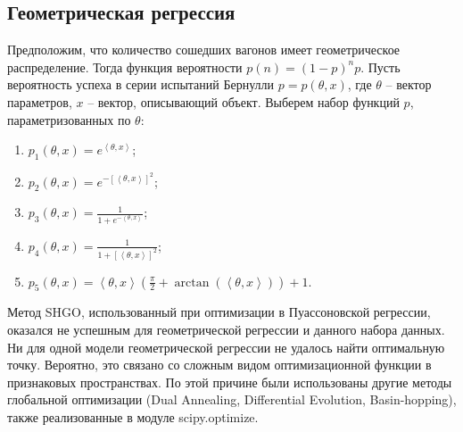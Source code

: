 


\subsection{Геометрическая регрессия}

Предположим, что количество сошедших вагонов имеет геометрическое распределение. Тогда функция вероятности $p(n) = (1-p)^n p$. Пусть вероятность успеха в серии испытаний Бернулли $p = p(\theta, x)$, где $\theta$ -- вектор параметров, $x$ -- вектор, описывающий объект. Выберем набор функций $p$, параметризованных по $\theta$:
\begin{enumerate}[label=\arabic*.]
    \item $p_1(\theta, x) = e^{\left\langle \theta, x\right\rangle}$;
    \item $p_2(\theta, x) = e^{-[\left\langle \theta, x\right\rangle]^2}$;
    \item $p_3(\theta, x) = \frac{1}{1+e^{-\left\langle \theta, x\right\rangle}}$;
    \item $p_4(\theta, x) = \frac{1}{1 + [\left\langle \theta, x\right\rangle]^2}$;
    \item $p_5(\theta, x) = \left\langle \theta, x\right\rangle (\frac{\pi}{2} + \arctan(\left\langle \theta, x\right\rangle)) + 1$.
\end{enumerate}

Метод SHGO, использованный при оптимизации в Пуассоновской регрессии, оказался не успешным для геометрической регрессии и данного набора данных. Ни для одной модели геометрической регрессии не удалось найти оптимальную точку. Вероятно, это связано со сложным видом оптимизационной функции в признаковых пространствах. По этой причине были использованы другие методы глобальной оптимизации (Dual Annealing, Differential Evolution, Basin-hopping), также реализованные в модуле scipy.optimize.

